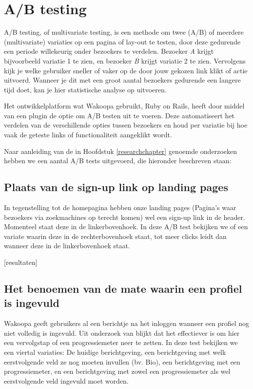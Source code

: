 \documentclass[a4paper, 10pt, pdftex]{report}
\begin{document}
    \section{A/B testing}
    A/B testing, of multivariate testing, is een methode om twee (A/B) of meerdere (multivariate) variaties op een pagina of lay-out te testen, door deze gedurende een periode willekeurig onder bezoekers te verdelen. Bezoeker \emph{A} krijgt bijvoorbeeld variatie 1 te zien, en bezoeker \emph{B} krijgt variatie 2 te zien. Vervolgens kijk je welke gebruiker sneller of vaker op de door jouw gekozen link klikt of actie uitvoerd. Wanneer je dit met een groot aantal bezoekers gedurende een langere tijd doet, kan je hier statistische analyse op uitvoeren.

   Het ontwikkelplatform wat Wakoopa gebruikt, Ruby on Rails, heeft door middel van een plugin de optie om A/B testen uit te voeren. Deze automatiseert het verdelen van de verschillende opties tussen bezoekers en houd per variatie bij hoe vaak de geteste links of functionaliteit aangeklikt wordt.

    Naar aanleiding van de in Hoofdstuk \ref{researchchapter} genoemde onderzoeken hebben we een aantal A/B tests uitgevoerd, die hieronder beschreven staan:

    \subsection{Plaats van de sign-up link op landing pages}
      In tegenstelling tot de homepagina hebben onze landing pages (Pagina's waar bezoekers via zoekmachines op terecht komen) wel een sign-up link in de header. Momenteel staat deze in de linkerbovenhoek. In deze A/B test bekijken we of een variate waarin deze in de rechterbovenhoek staat, tot meer clicks leidt dan wanneer deze in de linkerbovenhoek staat.

      [resultaten]

    \subsection{Het benoemen van de mate waarin een profiel is ingevuld}
      Wakoopa geeft gebruikers al een berichtje na het inloggen wanneer een profiel nog niet volledig is ingevuld. Uit onderzoek van \cite{Brouns2008} blijkt dat het effectiever is om hier een vervolgstap of een progressiemeter neer te zetten. In deze test bekijken we een viertal variaties: De huidige berichtgeving, een berichtgeving met welk eerstvolgende veld ze nog moeten invullen (bv. Bio), een berichtgeving met een progressiemeter, en een berichtgeving met zowel een progressiemeter als wel eerstvolgende veld ingevuld moet worden.
\end{document}
